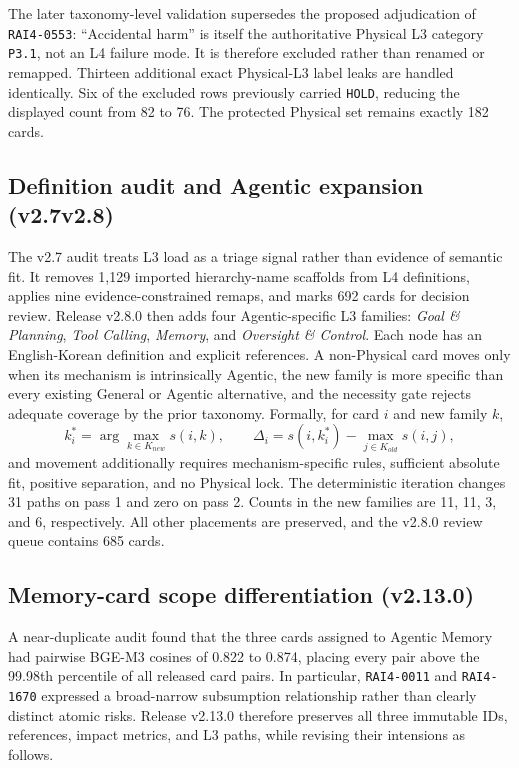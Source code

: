 \documentclass[11pt,a4paper]{article}
\newcommand{\code}[1]{\texttt{#1}}
\begin{document}
\begin{appendices}
The later taxonomy-level validation supersedes the proposed adjudication of
\code{RAI4-0553}: ``Accidental harm'' is itself the authoritative Physical L3
category \code{P3.1}, not an L4 failure mode. It is therefore excluded rather
than renamed or remapped. Thirteen additional exact Physical-L3 label leaks are
handled identically. Six of the excluded rows previously carried \code{HOLD},
reducing the displayed count from 82 to 76. The protected Physical set remains
exactly 182 cards.

\subsection{Definition audit and Agentic expansion (v2.7\textendash{}v2.8)}

The v2.7 audit treats L3 load as a triage signal rather than evidence of
semantic fit. It removes 1,129 imported hierarchy-name scaffolds from L4
definitions, applies nine evidence-constrained remaps, and marks 692 cards for
decision review. Release v2.8.0 then adds four Agentic-specific L3 families:
\textit{Goal \& Planning}, \textit{Tool Calling}, \textit{Memory}, and
\textit{Oversight \& Control}. Each node has an English-Korean definition and
explicit references. A non-Physical card moves only when its mechanism is
intrinsically Agentic, the new family is more specific than every existing
General or Agentic alternative, and the necessity gate rejects adequate
coverage by the prior taxonomy. Formally, for card $i$ and new family $k$,
\begin{equation}
 k_i^*=\arg\max_{k\in K_{new}} s(i,k),\qquad
 \Delta_i=s(i,k_i^*)-\max_{j\in K_{old}}s(i,j),
\end{equation}
and movement additionally requires mechanism-specific rules, sufficient
absolute fit, positive separation, and no Physical lock. The deterministic
iteration changes 31 paths on pass 1 and zero on pass 2. Counts in the new
families are 11, 11, 3, and 6, respectively. All other placements are
preserved, and the v2.8.0 review queue contains 685 cards.

\subsection{Memory-card scope differentiation (v2.13.0)}

A near-duplicate audit found that the three cards assigned to Agentic Memory
had pairwise BGE-M3 cosines of 0.822 to 0.874, placing every pair above the
99.98th percentile of all released card pairs. In particular,
\code{RAI4-0011} and \code{RAI4-1670} expressed a broad-narrow subsumption
relationship rather than clearly distinct atomic risks. Release v2.13.0
therefore preserves all three immutable IDs, references, impact metrics, and
L3 paths, while revising their intensions as follows.


\end{appendices}
\end{document}
